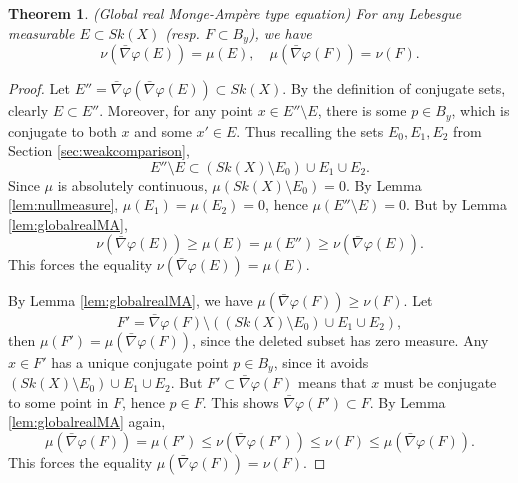 \documentclass[a4paper]{article}
\newtheorem{thm}{Theorem}[section]
\theoremstyle{definition}
\begin{document}
	
	
	

	
	
	\begin{thm}\label{thm:globalrealMA}
		(Global real Monge-Amp\`ere type equation)
	For any Lebesgue measurable $E\subset Sk(X)$ (resp. $F\subset B_y$), we have
	\[
	\nu( 	\bar{\nabla}\varphi (E  ) )= \mu(E), \quad \mu(	\bar{\nabla}\varphi (F))= \nu(F).
	\]
	\end{thm}
	
	
	
	\begin{proof}
	Let $E''= \bar{\nabla}\varphi ( \bar{\nabla}\varphi (E)    )\subset Sk(X)$. 
	By the definition of conjugate sets, clearly $E\subset E''$. Moreover, for any point $x\in E''\setminus E$, there is some $p\in B_y$, which is conjugate to both $x$ and some $x'\in E$. Thus recalling the sets $E_0, E_1, E_2$ from Section \ref{sec:weakcomparison},
	\[
	E'' \setminus E\subset  (Sk(X)\setminus E_0)\cup E_1\cup E_2.
	\]
	Since $\mu$ is absolutely continuous, $\mu(Sk(X)\setminus E_0)=0$. By Lemma \ref{lem:nullmeasure}, $\mu(E_1)=\mu(E_2)=0$, hence $\mu(E''\setminus E)=0$. 
	But
	by Lemma \ref{lem:globalrealMA}, 
	\[
	\nu( 	\bar{\nabla}\varphi (E  ) )\geq \mu(E)= \mu( E''  )\geq \nu(  	\bar{\nabla}\varphi (E  )  ).
	\]
	This forces the equality $\nu( 	\bar{\nabla}\varphi (E  ) )= \mu(E)$.
	
	
	
	
	By Lemma \ref{lem:globalrealMA}, we have $ \mu(	\bar{\nabla}\varphi (F))\geq  \nu(F)$. Let 
	\[
	F'= 	\bar{\nabla}\varphi (F) \setminus  ( (Sk(X)\setminus E_0)\cup E_1\cup E_2 ),
	\]
	then $\mu(F')= \mu(   	\bar{\nabla}\varphi (F)    )$, since the deleted subset has zero measure. Any $x\in F'$ has a unique conjugate point $p\in B_y$, since it avoids $(Sk(X)\setminus E_0)\cup E_1\cup E_2$. But $F'\subset \bar{\nabla}\varphi (F) $ means that $x$ must be conjugate to some point in $F$, hence $p\in F$. This shows $\bar{\nabla}\varphi (F')\subset F$. By Lemma \ref{lem:globalrealMA} again, 
	\[
 \mu(   	\bar{\nabla}\varphi (F)    )=	\mu(F') \leq \nu(  \bar{\nabla}\varphi (F')     )\leq \nu(F) \leq  \mu(   	\bar{\nabla}\varphi (F)    ).
	\]
	This forces the equality $ \mu(   	\bar{\nabla}\varphi (F)    )= \nu(F)$. 
	\end{proof}

	
	

	
	
	
	
\end{document}

